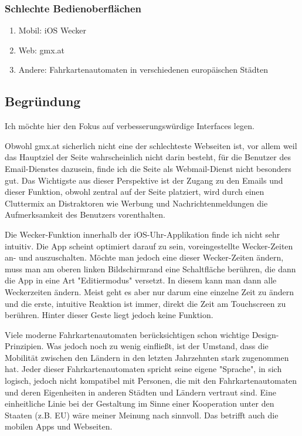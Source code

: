 \documentclass[11pt]{article}
\begin{document}
\subsubsection{Schlechte Bedienoberflächen}
\label{sec:org4999a2a}


\begin{enumerate}
\item Mobil: iOS Wecker
\item Web: gmx.at
\item Andere: Fahrkartenautomaten in verschiedenen europäischen Städten
\end{enumerate}

\subsection{Begründung}
\label{sec:org7dab56a}

Ich möchte hier den Fokus auf verbesserungswürdige Interfaces legen.

Obwohl gmx.at sicherlich nicht eine der schlechteste Webseiten ist,
vor allem weil das Hauptziel der Seite wahrscheinlich nicht darin
besteht, für die Benutzer des Email-Dienstes dazusein, finde ich
die Seite als Webmail-Dienst nicht besonders gut. Das Wichtigste
aus dieser Perspektive ist der Zugang zu den Emails und dieser
Funktion, obwohl zentral auf der Seite platziert, wird durch einen
Cluttermix an Distraktoren wie Werbung und Nachrichtenmeldungen die
Aufmerksamkeit des Benutzers vorenthalten.

Die Wecker-Funktion innerhalb der iOS-Uhr-Applikation finde ich
nicht sehr intuitiv. Die App scheint optimiert darauf zu sein,
voreingestellte Wecker-Zeiten an- und auszuschalten. Möchte man
jedoch eine dieser Wecker-Zeiten ändern, muss man am oberen linken
Bildschirmrand eine Schaltfläche berühren, die dann die App in eine
Art "Editiermodus" versetzt. In diesem kann man dann alle
Weckerzeiten ändern. Meist geht es aber nur darum eine einzelne
Zeit zu ändern und die erste, intuitive Reaktion ist immer, direkt
die Zeit am Touchscreen zu berühren. Hinter dieser Geste liegt
jedoch keine Funktion.

Viele moderne Fahrkartenautomaten berücksichtigen schon wichtige
Design-Prinzipien. Was jedoch noch zu wenig einfließt, ist der
Umstand, dass die Mobilität zwischen den Ländern in den letzten
Jahrzehnten stark zugenommen hat. Jeder dieser Fahrkartenautomaten
spricht seine eigene "Sprache", in sich logisch, jedoch nicht
kompatibel mit Personen, die mit den Fahrkartenautomaten und deren
Eigenheiten in anderen Städten und Ländern vertraut sind. Eine
einheitliche Linie bei der Gestaltung im Sinne einer Kooperation
unter den Staaten (z.B. EU) wäre meiner Meinung nach sinnvoll. Das
betrifft auch die mobilen Apps und Webseiten.
\end{document}
